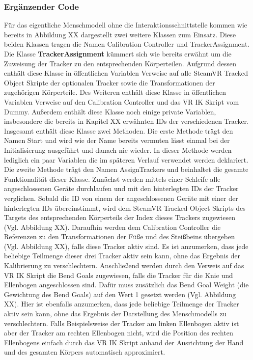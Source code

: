 \subsubsection{Ergänzender Code}\label{sec:MMCode}
Für das eigentliche Menschmodell ohne die Interaktionsschnittstelle kommen wie bereits in Abbildung XX dargestellt zwei weitere Klassen zum Einsatz. Diese beiden Klassen tragen die Namen Calibration Controller und TrackerAssignment.
\newline\newline
Die Klasse \textbf{TrackerAssignment} kümmert sich wie bereits erwähnt um die Zuweisung der Tracker zu den entsprechenden Körperteilen. Aufgrund dessen enthält diese Klasse in öffentlichen Variablen Verweise auf alle SteamVR Tracked Object Skripte der optionalen Tracker sowie die Transformationen der zugehörigen Körperteile. Des Weiteren enthält diese Klasse in öffentlichen Variablen Verweise auf den Calibration Controller und das VR IK Skript vom Dummy. Außerdem enthält diese Klasse noch einige private Variablen, insbesondere die bereits in Kapitel XX erwähnten IDs der verschiedenen Tracker.
\newline
Insgesamt enthält diese Klasse zwei Methoden. Die erste Methode trägt den Namen Start und wird wie der Name bereits vermuten lässt einmal bei der Initialisierung ausgeführt und danach nie wieder. In dieser Methode werden lediglich ein paar Variablen die im späteren Verlauf verwendet werden deklariert. Die zweite Methode trägt den Namen AssignTrackers und beinhaltet die gesamte Funktionalität dieser Klasse.
\newline
Zunächst werden mittels einer Schleife alle angeschlossenen Geräte durchlaufen und mit den hinterlegten IDs der Tracker verglichen. Sobald die ID von einem der angeschlossenen Geräte mit einer der hinterlegten IDs übereinstimmt, wird dem SteamVR Tracked Object Skripts des Targets des entsprechenden Körperteils der Index dieses Trackers zugewiesen (Vgl. Abbildung XX).
\newline
Daraufhin werden dem Calibration Controller die Referenzen zu den Transformationen der Füße und des Steißbeins übergeben (Vgl. Abbildung XX), falls diese Tracker aktiv sind. Es ist anzumerken, dass jede beliebige Teilmenge dieser drei Tracker aktiv sein kann, ohne das Ergebnis der Kalibrierung zu verschlechtern.
\newline
Anschließend werden durch den Verweis auf das VR IK Skript die Bend Goals zugewiesen, falls die Tracker für die Knie und Ellenbogen angeschlossen sind. Dafür muss zusätzlich das Bend Goal Weight (die Gewichtung des Bend Goals) auf den Wert 1 gesetzt werden (Vgl. Abbildung XX). Hier ist ebenfalls anzumerken, dass jede beliebige Teilmenge der Tracker aktiv sein kann, ohne das Ergebnis der Darstellung des Menschmodells zu verschlechtern. Falls Beispielsweise der Tracker am linken Ellenbogen aktiv ist aber der Tracker am rechten Ellenbogen nicht, wird die Position des rechten Ellenbogens einfach durch das VR IK Skript anhand der Ausrichtung der Hand und des gesamten Körpers automatisch approximiert.
